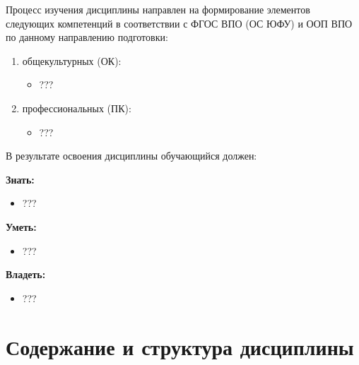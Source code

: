 	\ssect
Процесс изучения дисциплины направлен на формирование элементов следующих компетенций в соответствии с ФГОС ВПО (ОС ЮФУ) и ООП ВПО по данному направлению подготовки:
\begin{enumerate}
\rusitems %
	\item общекультурных (ОК):
	\begin{itemize}
		\item ???
	\end{itemize}

	\item профессиональных (ПК):
	\begin{itemize}
		\item ???
	\end{itemize}
\end{enumerate}

В результате освоения дисциплины обучающийся должен:

\textbf{Знать:}
	\begin{itemize}
		\item ???
	\end{itemize}

\textbf{Уметь:}
	\begin{itemize}
		\item ???
	\end{itemize}

\textbf{Владеть:}
	\begin{itemize}
		\item ???
	\end{itemize}

\section{Содержание и структура дисциплины}
	



